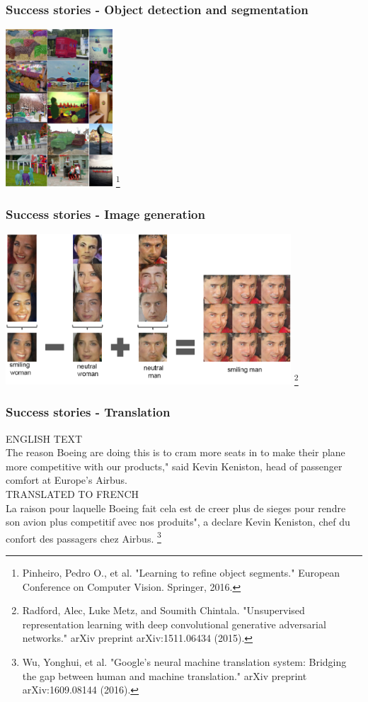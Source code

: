 \documentclass[\beamerclass]{beamer}
\newcommand\blfootnote[1]{%
  \begingroup
  \renewcommand\thefootnote{}\footnote{#1}%
  \addtocounter{footnote}{-1}%
  \endgroup
}
\begin{document}
\begin{frame}
	\frametitle{Success stories - Object detection and segmentation}
	\centering \includegraphics[width=0.3\textwidth]{objseg.pdf}\blfootnote{Pinheiro, Pedro O., et al. "Learning to refine object segments." European Conference on Computer Vision. Springer, 2016.}
\end{frame}

\begin{frame}
	\frametitle{Success stories - Image generation}
	\centering \includegraphics[width=0.8\textwidth]{imggen.pdf}\blfootnote{Radford, Alec, Luke Metz, and Soumith Chintala. "Unsupervised representation learning with deep convolutional generative adversarial networks." arXiv preprint arXiv:1511.06434 (2015).}
\end{frame}

\begin{frame}
	\frametitle{Success stories - Translation}

ENGLISH TEXT\\
The reason Boeing are doing this is to cram more seats in to make their plane
more competitive with our products," said Kevin Keniston, head of passenger
comfort at Europe's Airbus.
\\[1em]
TRANSLATED TO FRENCH\\
La raison pour laquelle Boeing fait cela est de creer plus de sieges pour rendre
son avion plus competitif avec nos produits", a declare Kevin Keniston, chef
du confort des passagers chez Airbus. \blfootnote{Wu, Yonghui, et al. "Google's neural machine translation system: Bridging the gap between human and machine translation." arXiv preprint arXiv:1609.08144 (2016).}

\end{frame}
\end{document}
